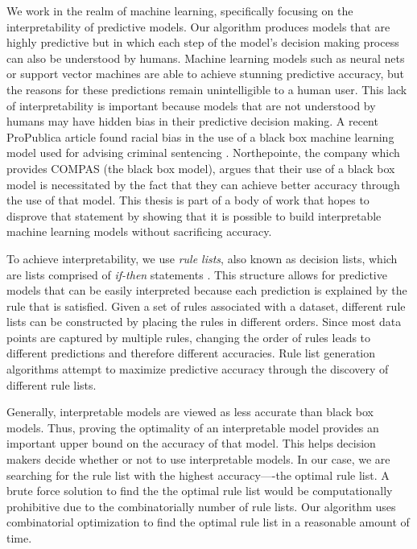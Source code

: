 \documentclass[]{report}
\theoremstyle{definition}
\begin{document}
We work in the realm of machine learning, specifically focusing on the interpretability of predictive models.
Our algorithm produces models that are highly predictive but in which each step of the model's decision making process can also be understood by humans.
Machine learning models such as neural nets or support vector machines are able to achieve stunning predictive accuracy, but the reasons for these predictions remain unintelligible to a human user.
This lack of interpretability is important because models that are not understood by humans may have hidden bias in their predictive decision making.
A recent ProPublica article found racial bias in the use of a black box machine learning model used for advising criminal sentencing \cite{LarsonMaKiAn16}.
Northepointe, the company which provides COMPAS (the black box model), argues that their use of a black box model is necessitated by the fact that they can achieve better accuracy through the use of that model.
This thesis is part of a body of work that hopes to disprove that statement by showing that it is possible to build interpretable machine learning models without sacrificing accuracy.

To achieve interpretability, we use \emph{rule lists}, also known as decision lists, which are lists comprised of \emph{if-then} statements \cite{Rivest87}. 
This structure allows for predictive models that can be easily interpreted because each prediction is explained by the rule that is satisfied. 
Given a set of rules associated with a dataset, different rule lists can be constructed by placing the rules in different orders.
Since most data points are captured by multiple rules, changing the order of rules leads to different predictions and therefore different accuracies. 
Rule list generation algorithms attempt to maximize predictive accuracy through the discovery of different rule lists.

Generally, interpretable models are viewed as less accurate than black box models.
Thus, proving the optimality of an interpretable model provides an important upper bound on the accuracy of that model.
This helps decision makers decide whether or not to use interpretable models.
In our case, we are searching for the rule list with the highest accuracy----the optimal rule list. 
A brute force solution to find the the optimal rule list would be computationally prohibitive due to the combinatorially number of rule lists.
Our algorithm uses combinatorial optimization to find the optimal rule list in a reasonable amount of time.
\end{document}
